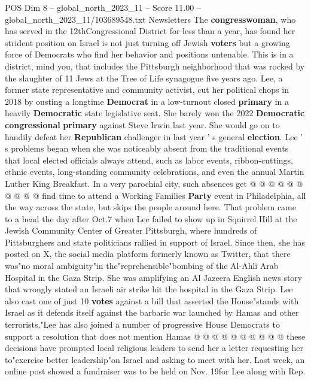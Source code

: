 \begin{textsample}{POS Dim 8 – global\_north\_2023\_11 – Score 11.00 – global\_north\_2023\_11/103689548.txt}  \label{ex:f8_pos_122}
Newsletters The \textbf{congresswoman}, who has served in the 12thCongressional District for less than a year, has found her strident position on Israel is not just turning off Jewish \textbf{voters} but a growing force of Democrats who find her behavior and positions untenable.
This is in a district, mind you, that includes the Pittsburgh neighborhood that was rocked by the slaughter of 11 Jews at the Tree of Life synagogue five years ago.
Lee, a former state representative and community activist, cut her political chops in 2018 by ousting a longtime \textbf{Democrat} in a low-turnout closed \textbf{primary} in a heavily \textbf{Democratic} state legislative seat.
She barely won the 2022 \textbf{Democratic} \textbf{congressional} \textbf{primary} against Steve Irwin last year.
She would go on to handily defeat her \textbf{Republican} challenger in last year ' s general \textbf{election}.
Lee ' s problems began when she was noticeably absent from the traditional events that local elected officials always attend, such as labor events, ribbon-cuttings, ethnic events, long-standing community celebrations, and even the annual Martin Luther King Breakfast.
In a very parochial city, such absences get @ @ @ @ @ @ @ @ @ @ find time to attend a Working Families \textbf{Party} event in Philadelphia, all the way across the state, but skips the people around here.
That problem came to a head the day after Oct.7 when Lee failed to show up in Squirrel Hill at the Jewish Community Center of Greater Pittsburgh, where hundreds of Pittsburghers and state politicians rallied in support of Israel.
Since then, she has posted on X, the social media platform formerly known as Twitter, that there was"no moral ambiguity"in the"reprehensible"bombing of the Al-Ahli Arab Hospital in the Gaza Strip.
She was amplifying an Al Jazeera English news story that wrongly stated an Israeli air strike hit the hospital in the Gaza Strip.
Lee also cast one of just 10 \textbf{votes} against a bill that asserted the House"stands with Israel as it defends itself against the barbaric war launched by Hamas and other terrorists."Lee has also joined a number of progressive House Democrats to support a resolution that does not mention Hamas @ @ @ @ @ @ @ @ @ @ these decisions have prompted local religious leaders to send her a letter requesting her to"exercise better leadership"on Israel and asking to meet with her.
Last week, an online post showed a fundraiser was to be held on Nov. 19for Lee along with Rep.

\end{textsample}
